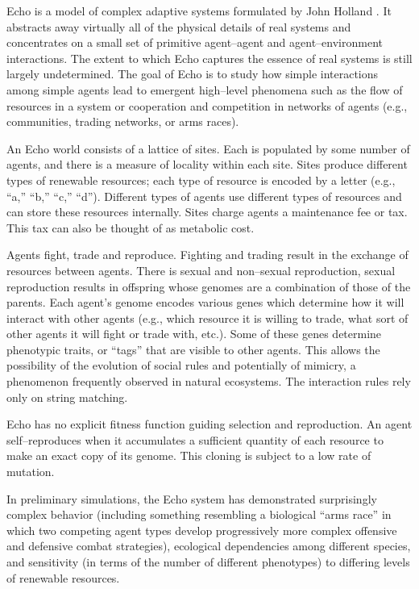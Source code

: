 Echo is a model of complex adaptive systems formulated by John Holland
\cite{holland-92a,holland-92b,holland-93}. 
It abstracts away virtually all of the physical details of real
systems and concentrates on a small set of primitive agent--agent and
agent--environment interactions.  The extent to which Echo captures
the essence of real systems is still largely undetermined.  The goal
of Echo is to study how simple interactions among simple agents lead
to emergent high--level phenomena such as the flow of resources in a
system or cooperation and competition in networks of agents (e.g.,
communities, trading networks, or arms races).

An Echo world consists of a lattice of sites. Each is populated by
some number of agents, and there is a measure of locality within each
site.  Sites produce different types of renewable resources; each type
of resource is encoded by a letter (e.g., ``a,'' ``b,'' ``c,'' ``d'').
Different types of agents use different types of resources and can
store these resources internally. Sites charge agents a maintenance
fee or tax. This tax can also be thought of as metabolic cost.

Agents fight, trade and reproduce. Fighting and trading
result in the exchange of resources between agents. There is sexual
and non--sexual reproduction, sexual reproduction
results in offspring whose genomes are a combination of those
of the parents. Each agent's genome encodes various genes
which determine how it will interact with other agents (e.g., which
resource it is willing to trade, what sort of other agents it will
fight or trade with, etc.).  Some of these genes determine phenotypic
traits, or ``tags'' that are visible to other agents.  This
allows the possibility of the evolution of social rules and
potentially of mimicry, a phenomenon frequently observed in
natural ecosystems. The interaction rules rely only on string
matching.

Echo has no explicit fitness function guiding selection and
reproduction.  An agent self--reproduces when it accumulates a
sufficient quantity of each resource to make an exact copy of its
genome.  This cloning is subject to a low rate of mutation.

In preliminary simulations, the Echo system has demonstrated
surprisingly complex behavior (including something resembling a
biological ``arms race'' in which two competing agent types develop
progressively more complex offensive and defensive combat strategies),
ecological dependencies among different species, and sensitivity (in
terms of the number of different phenotypes) to differing levels of
renewable resources.

